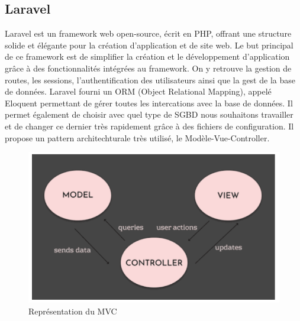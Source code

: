 \subsection{Laravel}
Laravel est un framework web open-source, écrit en PHP, offrant une structure solide et élégante pour la création d'application et de site web. Le but principal de ce framework est de simplifier la création et le développement d'application grâce à des fonctionnalités intégrées au framework. On y retrouve la gestion de routes, les sessions, l'authentification des utilisateurs ainsi que la gest de la base de données.
Laravel fourni un ORM (Object Relational Mapping), appelé Eloquent permettant de gérer toutes les intercations avec la base de données. Il permet également de choisir avec quel type de SGBD nous souhaitons travailler et de changer ce dernier très rapidement grâce à des fichiers de configuration.
Il propose un pattern architechturale très utilisé, le Modèle-Vue-Controller.
\begin{center}
  \begin{figure}[H]%
    \includegraphics[width=\textwidth]{./assets/figures/MVCExplanation.png}
    \caption{Représentation du MVC \label{MVCExplanation.png}}
  \end{figure}
\end{center}

